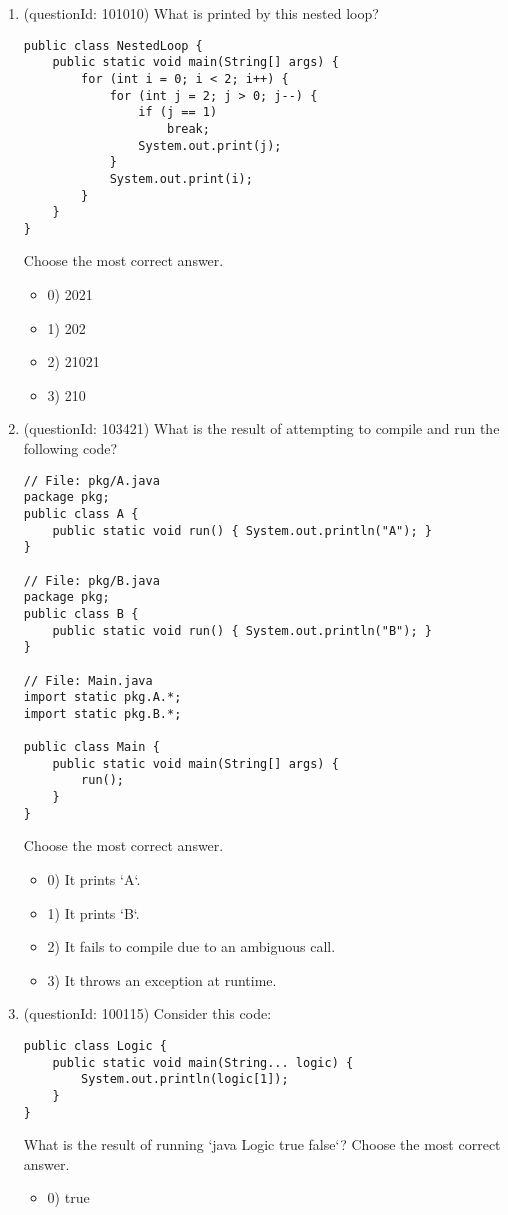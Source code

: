 \documentclass[12pt]{article}
\begin{document}
\begin{enumerate}[label=(\arabic*)]
\begin{itemize}
\end{itemize}
\item (questionId: 101010) What is printed by this nested loop?\n\begin{verbatim}
public class NestedLoop {
    public static void main(String[] args) {
        for (int i = 0; i < 2; i++) {
            for (int j = 2; j > 0; j--) {
                if (j == 1)
                    break;
                System.out.print(j);
            }
            System.out.print(i);
        }
    }
}
\end{verbatim}
Choose the most correct answer. 
\begin{itemize}
\item 0) 2021

\item 1) 202

\item 2) 21021

\item 3) 210

\end{itemize}
\item (questionId: 103421) What is the result of attempting to compile and run the following code?
\begin{verbatim}
// File: pkg/A.java
package pkg;
public class A { 
    public static void run() { System.out.println("A"); } 
}

// File: pkg/B.java
package pkg;
public class B { 
    public static void run() { System.out.println("B"); } 
}

// File: Main.java
import static pkg.A.*;
import static pkg.B.*;

public class Main {
    public static void main(String[] args) {
        run();
    }
}
\end{verbatim}
Choose the most correct answer. 
\begin{itemize}
\item 0) It prints `A`.

\item 1) It prints `B`.

\item 2) It fails to compile due to an ambiguous call.

\item 3) It throws an exception at runtime.

\end{itemize}
\item (questionId: 100115) Consider this code:
\begin{verbatim}
public class Logic {
    public static void main(String... logic) {
        System.out.println(logic[1]);
    }
}
\end{verbatim}
What is the result of running `java Logic true false`?
Choose the most correct answer. 
\begin{itemize}
\item 0) true


\end{itemize}
\end{enumerate}
\end{document}
